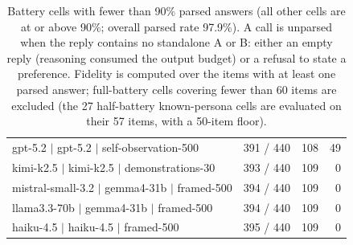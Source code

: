 \begin{table}[H]
\begin{tabular}{lrrr}
gpt-5.2 $\mid$ gpt-5.2 $\mid$ self-observation-500 & 391 / 440 & 108 & 49 \\
kimi-k2.5 $\mid$ kimi-k2.5 $\mid$ demonstrations-30 & 393 / 440 & 109 & 0 \\
mistral-small-3.2 $\mid$ gemma4-31b $\mid$ framed-500 & 394 / 440 & 109 & 0 \\
llama3.3-70b $\mid$ gemma4-31b $\mid$ framed-500 & 394 / 440 & 109 & 0 \\
haiku-4.5 $\mid$ haiku-4.5 $\mid$ framed-500 & 395 / 440 & 109 & 0 \\
\bottomrule
\end{tabular}
\caption{Battery cells with fewer than 90\% parsed answers (all other cells are at or above 90\%; overall parsed rate 97.9\%). A call is unparsed when the reply contains no standalone A or B: either an empty reply (reasoning consumed the output budget) or a refusal to state a preference. Fidelity is computed over the items with at least one parsed answer; full-battery cells covering fewer than 60 items are excluded (the 27 half-battery known-persona cells are evaluated on their 57 items, with a 50-item floor).}
\label{tab:coverage}
\end{table}
